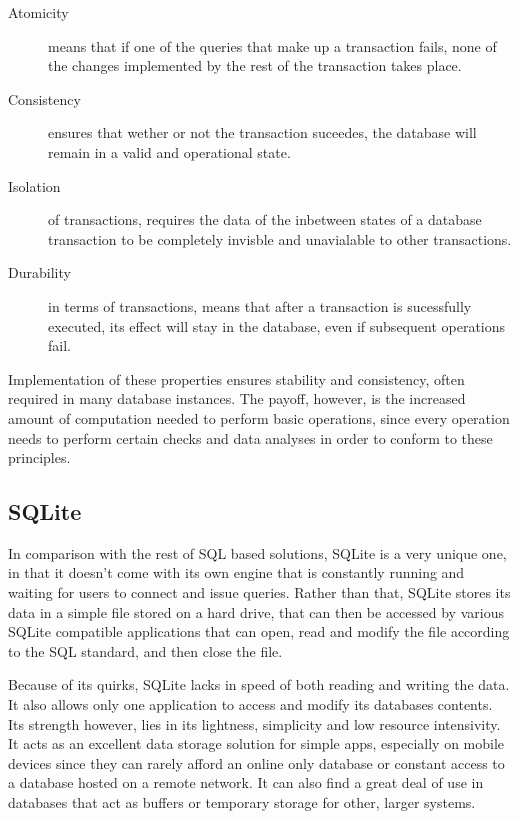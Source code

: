 \begin{description}
  \item[Atomicity] means that if one of the queries that make up a transaction fails, none of the changes implemented by the rest of the transaction takes place.
  \item[Consistency] ensures that wether or not the transaction suceedes, the database will remain in a valid and operational state.
  \item[Isolation] of transactions, requires the data of the inbetween states of a database transaction to be completely invisble and unavialable to other transactions.
  \item[Durability] in terms of transactions, means that after a transaction is sucessfully executed, its effect will stay in the database, even if subsequent operations fail.
\end{description}
\par Implementation of these properties ensures stability and consistency, often required in many database instances. The payoff, however, is the increased amount of computation needed to perform basic operations, since every operation needs to perform certain checks and data analyses in order to conform to these principles.

%
\subsection{SQLite}
\label{subsec:background:first_seciton:first_subsection}
\par In comparison with the rest of SQL based solutions, SQLite is a very unique one, in that it doesn't come with its own engine that is constantly running and waiting for users to connect and issue queries. Rather than that, SQLite stores its data in a simple file stored on a hard drive, that can then be accessed by various SQLite compatible applications that can open, read and modify the file according to the SQL standard, and then close the file.

\par Because of its quirks, SQLite lacks in speed of both reading and writing the data. It also allows only one application to access and modify its databases contents. Its strength however, lies in its lightness, simplicity and low resource intensivity. It acts as an excellent data storage solution for simple apps, especially on mobile devices since they can rarely afford an online only database or constant access to a database hosted on a remote network. It can also find a great deal of use in databases that act as buffers or temporary storage for other, larger systems.\citep{OwensSQLite}

